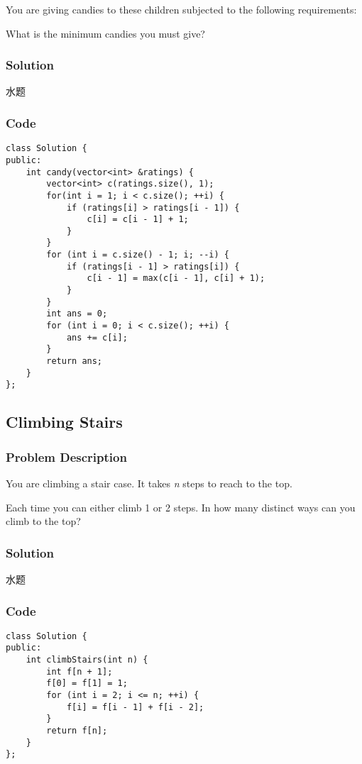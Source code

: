 \documentclass[courier]{article}
\begin{document}
\begin{CJK*}{UTF8}{gkai}
You are giving candies to these children subjected to the following requirements:

What is the minimum candies you must give?



\subsubsection*{Solution}
水题

\subsubsection*{Code}
\begin{lstlisting}
class Solution {
public:
    int candy(vector<int> &ratings) {
        vector<int> c(ratings.size(), 1);
        for(int i = 1; i < c.size(); ++i) {
            if (ratings[i] > ratings[i - 1]) {
                c[i] = c[i - 1] + 1;
            }
        }
        for (int i = c.size() - 1; i; --i) {
            if (ratings[i - 1] > ratings[i]) {
                c[i - 1] = max(c[i - 1], c[i] + 1);
            }
        }
        int ans = 0;
        for (int i = 0; i < c.size(); ++i) {
            ans += c[i];
        }
        return ans;
    }
}; 
\end{lstlisting}


\subsection{ Climbing Stairs }

\subsubsection*{Problem Description}
You are climbing a stair case. It takes \emph{n} steps to reach to the top.

Each time you can either climb 1 or 2 steps. In how many distinct ways can you climb to the top?



\subsubsection*{Solution}
水题

\subsubsection*{Code}
\begin{lstlisting}
class Solution {
public:
    int climbStairs(int n) {
        int f[n + 1];
        f[0] = f[1] = 1;
        for (int i = 2; i <= n; ++i) {
            f[i] = f[i - 1] + f[i - 2];
        }
        return f[n];
    }
}; 
\end{lstlisting}



\end{CJK*}
\end{document}
